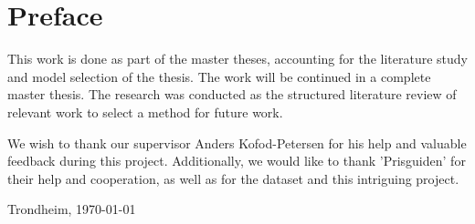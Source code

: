 \section*{Preface}



\vspace{1cm}

This work is done as part of the master theses, accounting for the literature study and model selection of the thesis.
The work will be continued in a complete master thesis.
The research was conducted as the structured literature review of relevant work to select a method for future work.

We wish to thank our supervisor Anders Kofod-Petersen for his help and valuable feedback during this project.
Additionally, we would like to thank 'Prisguiden' for their help and cooperation,
as well as for the dataset and this intriguing project.

\vfill

\hfill \thesisAuthor

\hfill Trondheim, \today